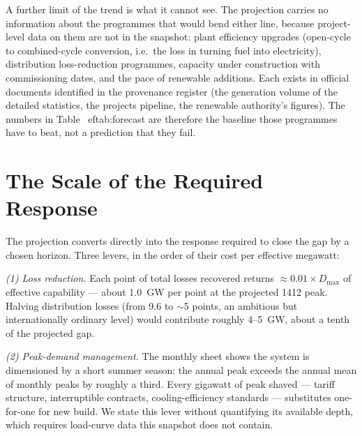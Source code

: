 \documentclass[conference]{IEEEtran}
\begin{document}
A further limit of the trend is what it cannot see. The projection carries no information about the programmes that would bend either line, because project-level data on them are not in the snapshot: plant efficiency upgrades (open-cycle to combined-cycle conversion, i.e.\ the loss in turning fuel into electricity), distribution loss-reduction programmes, capacity under construction with commissioning dates, and the pace of renewable additions. Each exists in official documents identified in the provenance register (the generation volume of the detailed statistics, the projects pipeline, the renewable authority's figures). The numbers in Table~
ef{tab:forecast} are therefore the baseline those programmes have to beat, not a prediction that they fail.

\section{The Scale of the Required Response}
\label{sec:budget}
The projection converts directly into the response required to close the gap by a chosen horizon. Three levers, in the order of their cost per effective megawatt:

\emph{(1) Loss reduction.} Each point of total losses recovered returns $\approx 0.01 \times D_{\max}$ of effective capability --- about 1.0~GW per point at the projected 1412 peak. Halving distribution losses (from 9.6 to $\sim$5 points, an ambitious but internationally ordinary level) would contribute roughly 4--5~GW, about a tenth of the projected gap.

\emph{(2) Peak-demand management.} The monthly sheet shows the system is dimensioned by a short summer season: the annual peak exceeds the annual mean of monthly peaks by roughly a third. Every gigawatt of peak shaved --- tariff structure, interruptible contracts, cooling-efficiency standards --- substitutes one-for-one for new build. We state this lever without quantifying its available depth, which requires load-curve data this snapshot does not contain.
\end{document}
